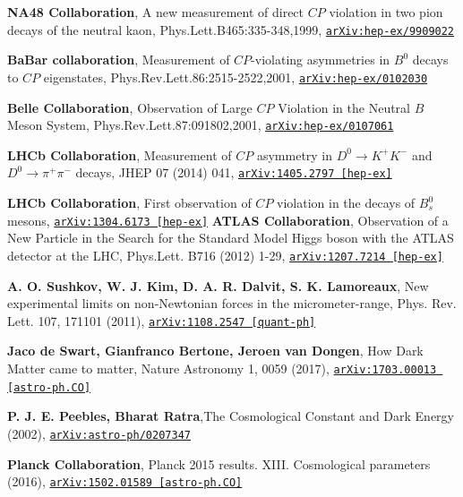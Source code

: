 \documentclass[11pt,a4paper,openright,twoside]{report}
\begin{document}
\begin{thebibliography}{9}
\textbf{NA48 Collaboration}, A new measurement of direct $CP$ violation in two pion decays of the neutral kaon,  	Phys.Lett.B465:335-348,1999, \href{https://arxiv.org/abs/hep-ex/9909022}{\texttt{arXiv:hep-ex/9909022}}

\textbf{BaBar collaboration}, Measurement of $CP$-violating asymmetries in $B^0$ decays to $CP$ eigenstates, Phys.Rev.Lett.86:2515-2522,2001, \href{https://arxiv.org/abs/hep-ex/0102030}{\texttt{arXiv:hep-ex/0102030}}

\textbf{Belle Collaboration}, Observation of Large $CP$ Violation in the Neutral $B$ Meson System, Phys.Rev.Lett.87:091802,2001, \href{https://arxiv.org/abs/hep-ex/0107061}{\texttt{arXiv:hep-ex/0107061}}

\textbf{LHCb Collaboration}, Measurement of $CP$ asymmetry in $D^0 \to K^+ K^-$ and $D^0 \to \pi^+ \pi^-$ decays, JHEP 07 (2014) 041, \href{https://arxiv.org/abs/1405.2797}{\texttt{arXiv:1405.2797 [hep-ex]}}

\textbf{LHCb Collaboration}, First observation of $CP$ violation in the decays of $B^0_s$ mesons, \href{https://arxiv.org/abs/1304.6173}{\texttt{arXiv:1304.6173 [hep-ex]}}
	\textbf{ATLAS Collaboration}, Observation of a New Particle in the Search for the Standard Model Higgs boson with the ATLAS detector at the LHC, Phys.Lett. B716 (2012) 1-29, \href{https://arxiv.org/abs/1207.7214}{\texttt{arXiv:1207.7214 [hep-ex]}}
	
	\textbf{A. O. Sushkov, W. J. Kim, D. A. R. Dalvit, S. K. Lamoreaux}, New experimental limits on non-Newtonian forces in the micrometer-range, Phys. Rev. Lett. 107, 171101 (2011), \href{https://arxiv.org/abs/1108.2547}{\texttt{arXiv:1108.2547 [quant-ph]}}
	
	\textbf{Jaco de Swart, Gianfranco Bertone, Jeroen van Dongen}, How Dark Matter came to matter, Nature Astronomy 1, 0059 (2017), \href{https://arxiv.org/abs/1703.00013}{\texttt{arXiv:1703.00013 [astro-ph.CO]}}
	
	\textbf{P. J. E. Peebles, Bharat Ratra},The Cosmological Constant and Dark Energy (2002), \href{https://arxiv.org/abs/astro-ph/0207347}{\texttt{arXiv:astro-ph/0207347}}

	\textbf{Planck Collaboration}, Planck 2015 results. XIII. Cosmological parameters (2016), \href{https://arxiv.org/abs/1502.01589}{\texttt{arXiv:1502.01589 [astro-ph.CO]}}


\end{thebibliography}
\end{document}
